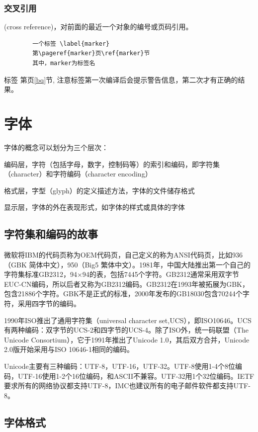 \documentclass[16pt]{article}
\begin{document}
\subsubsection{交叉引用}
(cross reference)，对前面的最近一个对象的编号或页码引用。
\begin{lstlisting}
        一个标签 \label{marker}
        第\pageref{marker}页\ref{marker}节
        其中，marker为标签名
    \end{lstlisting}
标签 \label{bq}
第\pageref{bq}页\ref{bq}节,
注意标签第一次编译后会提示警告信息，第二次才有正确的结果。


\section{字体}
字体的概念可以划分为三个层次：\par
\begin{compactenum}
    \item 编码层，字符（包括字母，数字，控制码等）的索引和编码，即字符集（character）和字符编码（character encoding）
    \item 格式层，字型（glyph）的定义描述方法，字体的文件储存格式
    \item 显示层，字体的外在表现形式，如字体的样式或具体的字体
\end{compactenum}
\subsection{字符集和编码的故事}
微软将IBM的代码页称为OEM代码页，自己定义的称为ANSI代码页，比如936（GBK 简体中文），950（Big5 繁体中文）。1981年，中国大陆推出第一个自己的字符集标准GB2312，94×94的表，包括7445个字符。GB2312通常采用双字节EUC-CN编码，所以后者又称为GB2312编码。GB2312在1993年被拓展为GBK，包含21886个字符。GBK不是正式的标准，2000年发布的GB18030包含70244个字符，采用四字节的编码。\par
1990年ISO推出了通用字符集（universal character set,UCS），即ISO10646。UCS有两种编码：双字节的UCS-2和四字节的UCS-4。除了ISO外，统一码联盟（The Unicode Consortium），它于1991年推出了Unicode 1.0，其后双方合并，Unicode 2.0版开始采用与ISO 10646-1相同的编码。 \par
Unicode主要有三种编码：UTF-8，UTF-16，UTF-32。UTF-8使用1-4个8位编码，UTF-16使用1-2个16位编码，和ASCII不兼容。UTF-32用1个32位编码。IETF要求所有的网络协议都支持UTF-8，IMC也建议所有的电子邮件软件都支持UTF-8。
\subsection{字体格式}
\end{document}
